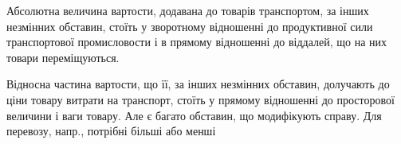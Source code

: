 Абсолютна величина вартости, додавана до товарів транспортом, за
інших незмінних обставин, стоїть у зворотному відношенні до продуктивної
сили транспортової промисловости і в прямому відношенні до віддалей,
що на них товари переміщуються.

Відносна частина вартости, що її, за інших незмінних обставин,
долучають до ціни товару витрати на транспорт, стоїть у прямому відношенні
до просторової величини і ваги товару. Але є багато обставин,
що модифікують справу. Для перевозу, напр., потрібні більші або менші